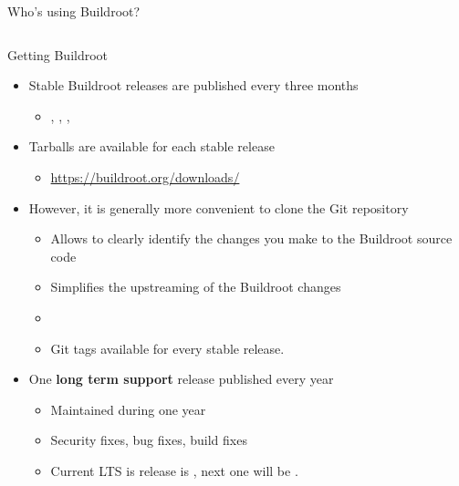 \begin{frame}{Who's using Buildroot?}
\begin{columns}
  \end{columns}
\end{frame}

\begin{frame}{Getting Buildroot}
  \begin{itemize}
  \item Stable Buildroot releases are published every three months
    \begin{itemize}
    \item {}, , ,
    \end{itemize}
  \item Tarballs are available for each stable release
    \begin{itemize}
    \item \url{https://buildroot.org/downloads/}
    \end{itemize}
  \item However, it is generally more convenient to clone the Git
    repository
    \begin{itemize}
    \item Allows to clearly identify the changes you make to the
      Buildroot source code
    \item Simplifies the upstreaming of the Buildroot changes
    \item {}
    \item Git tags available for every stable release.
    \end{itemize}
  \item One {\bf long term support} release published every year
    \begin{itemize}
    \item Maintained during one year
    \item Security fixes, bug fixes, build fixes
    \item Current LTS is release is , next one will be
      .
    \end{itemize}
  \end{itemize}
\end{frame}

